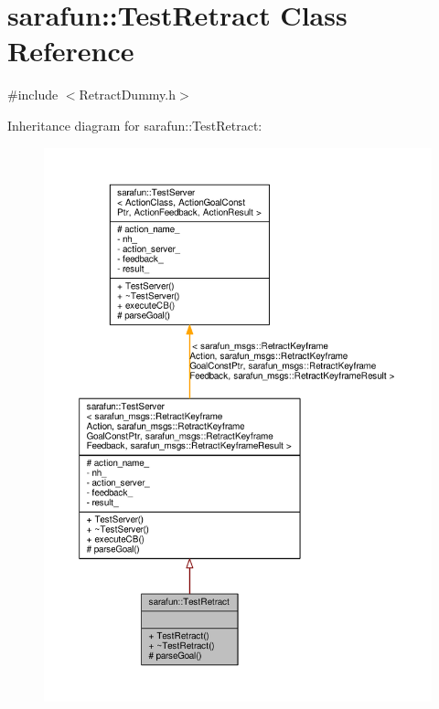 \hypertarget{classsarafun_1_1TestRetract}{\section{sarafun\-:\-:Test\-Retract Class Reference}
\label{classsarafun_1_1TestRetract}
}


{\ttfamily \#include $<$Retract\-Dummy.\-h$>$}



Inheritance diagram for sarafun\-:\-:Test\-Retract\-:
\nopagebreak
\begin{figure}[H]
\begin{center}
\leavevmode
\includegraphics[width=350pt]{d4/db6/classsarafun_1_1TestRetract__inherit__graph}
\end{center}
\end{figure}


